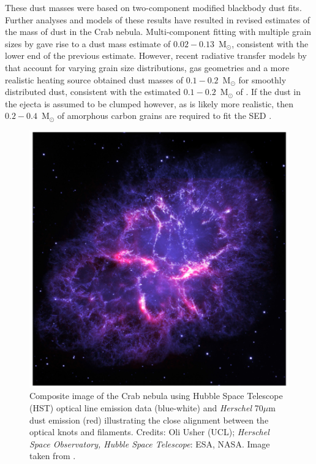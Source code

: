  These dust masses were based on  two-component modified blackbody dust fits.  Further analyses and models of these results have resulted in revised estimates of the mass of dust in the Crab nebula.  Multi-component fitting with multiple grain sizes by \citet{Temim2013} gave rise to a dust mass estimate of $0.02-0.13$~M$_{\odot}$, consistent with the lower end of the previous estimate.  However, recent radiative transfer models by \citet{Owen2015} that account for varying grain size distributions, gas geometries and a more realistic heating source obtained dust masses of $0.1-0.2$~M$_{\odot}$ for smoothly distributed dust, consistent with the estimated $0.1-0.2$~M$_{\odot}$ of \citet{Gomez2012}.  If the dust in the ejecta is assumed to be clumped however, as is likely more realistic, then $0.2 - 0.4$~M$_{\odot}$ of amorphous carbon grains are required to fit the SED \citep{Owen2015}. 
 
 \begin{figure}
\centering
\includegraphics[clip=true,scale=0.3,trim= 0 0 0 0]{chapters/chapter1/figs/Crab.png}
\caption{Composite image of the Crab nebula using Hubble Space Telescope (HST) optical line emission data (blue-white) and {\em Herschel} 70$\mu$m dust emission (red) illustrating the close alignment between the optical knots and filaments.  Credits: Oli Usher (UCL); \textit{Herschel Space Observatory, Hubble Space Telescope}: ESA, NASA.  Image taken from \citet{Owen2015}.}
\label{fig:Crab}
\end{figure}
 
